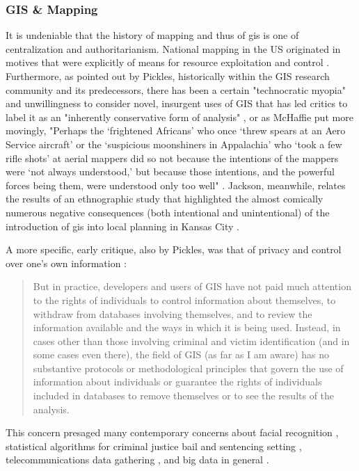 \subsubsection{GIS \& Mapping} \label{sec:mapping_critique}

It is undeniable that the history of mapping and thus of \ac{gis} is one of centralization and authoritarianism. National mapping in the US originated in motives that were explicitly of means for resource exploitation and control \cite{mchaffieManufacturingMetaphors1994}. Furthermore, as pointed out by Pickles, historically within the GIS research community and its predecessors, there has been a certain "technocratic myopia" and unwillingness to consider novel, insurgent uses of GIS that has led critics to label it as an "inherently conservative form of analysis" \cite{picklesRepresentationsElectronicAge1994}, or as McHaffie put more movingly, "Perhaps the `frightened Africans' who once `threw spears at an Aero Service aircraft' or the `suspicious moonshiners in Appalachia' who `took a few rifle shots' at aerial mappers did so not because the intentions of the mappers were `not always understood,' but because those intentions, and the powerful forces being them, were understood only too well" \cite{mchaffieManufacturingMetaphors1994}. Jackson, meanwhile, relates the results of an ethnographic study that highlighted the almost comically numerous negative consequences (both intentional and unintentional) of the introduction of \ac{gis} into local planning in Kansas City \cite{jacksonCityThirtyThousand2008}.

A more specific, early critique, also by Pickles, was that of privacy and control over one's own information \cite{picklesToolScienceGIS1997}:

\blockquote{But in practice, developers and users of GIS have not paid much attention to the rights of individuals to control information about themselves, to withdraw from databases involving themselves, and to review the information available and the ways in which it is being used. Instead, in cases other than those involving criminal and victim identification (and in some cases even there), the field of GIS (as far as I am aware) has no substantive protocols or methodological principles that govern the use of information about individuals or guarantee the rights of individuals included in databases to remove themselves or to see the results of the analysis.}

This concern presaged many contemporary concerns about facial recognition \cite{selingerEthicsFacialRecognition2021}, statistical algorithms for criminal justice bail and sentencing setting \cite{barabasBiasReImaginingTerms2019}, telecommunications data gathering \cite{mcdonaldEbolaBigData2016}, and big data in general \cite{boydCriticalQuestionsBig2012}.

